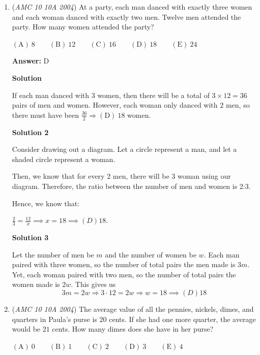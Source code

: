 \begin{enumerate}
 Education, the Study of Everything

 


	\item (\textit{AMC 10 10A 2004}) At a party, each man danced with exactly three women and each woman danced with exactly two men.  Twelve men attended the party.  How many women attended the party?


 $\mathrm{(A) \ } 8 \qquad \mathrm{(B) \ } 12 \qquad \mathrm{(C) \ } 16 \qquad \mathrm{(D) \ } 18 \qquad \mathrm{(E) \ } 24$

 \textbf{Answer: }D



\textbf{Solution}

If each man danced with $3$ women, then there will be a total of $3\times12=36$ pairs of men and women.  However, each woman only danced with $2$ men, so there must have been $\frac{36}2 \Longrightarrow \boxed{\mathrm{(D)}\ 18}$ women.

 



\textbf{Solution 2}

Consider drawing out a diagram. Let a circle represent a man, and let a shaded circle represent a woman. 

 Then, we know that for every 2 men, there will be 3 woman using our diagram. Therefore, the ratio between the number of men and women is 2:3.

 Hence, we know that:

 $\frac{2}{3} = \frac{12}{x} \implies x = 18 \implies \boxed{(D) 18}.$




\textbf{Solution 3}

Let the number of men be $m$ and the number of women be $w$. Each man paired with three women, so the number of total pairs the men made is $3m$. Yet, each woman paired with two men, so the number of total pairs the women made is $2w$. This gives us 
 \[3m = 2w \Rightarrow 3 \cdot 12 = 2w \Rightarrow w = 18 \implies \boxed{(D) 18}\]



	\item (\textit{AMC 10 10A 2004}) The average value of all the pennies, nickels, dimes, and quarters in Paula's purse is $20$ cents.  If she had one more quarter, the average would be $21$ cents.  How many dimes does she have in her purse?


 $\mathrm{(A) \ } 0 \qquad \mathrm{(B) \ } 1 \qquad \mathrm{(C) \ } 2 \qquad \mathrm{(D) \ } 3 \qquad \mathrm{(E) \ } 4$


\end{enumerate}
